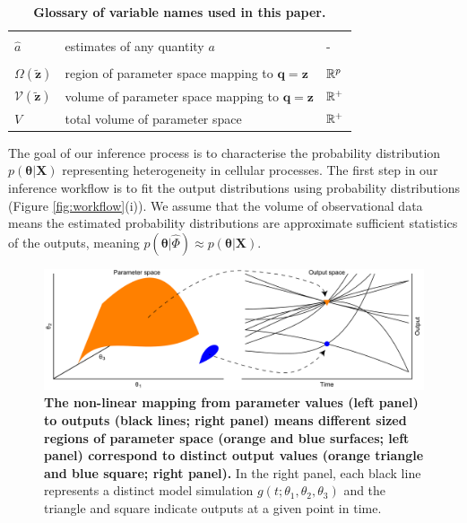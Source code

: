 \begin{table}[htbp]
\begin{adjustwidth}{-0.5in}{-0.5in}
\begin{tabularx}{1.1\textwidth}{lll}
&&\\
$\hat{a}$ & estimates of any quantity $a$                                                                             & - \\
&&\\
$\Omega(\tilde{\boldsymbol{z}})$      & region of parameter space mapping to $\boldsymbol{q}=\boldsymbol{z}$          & $\mathbb{R}^p$ \\
$\mathcal{V}(\tilde{\boldsymbol{z}})$ & volume of parameter space mapping to $\boldsymbol{q}=\boldsymbol{z}$          & $\mathbb{R}^+$ \\
$V$                                   & total volume of parameter space                                               & $\mathbb{R}^+$ \\
\end{tabularx}
\caption{\textbf{Glossary of variable names used in this paper.}} %
\label{tab:variable_glossary}
\end{adjustwidth}
\end{table}


The goal of our inference process is to  characterise the probability distribution $p(\boldsymbol{\theta}|\boldsymbol{X})$ representing heterogeneity in cellular processes. The first step in our inference workflow is to fit the output distributions using probability distributions (Figure \ref{fig:workflow}(i)). We assume that the volume of observational data means the estimated probability distributions are approximate sufficient statistics of the outputs, meaning $p(\boldsymbol{\theta}|\hat{\Phi}) \approx p(\boldsymbol{\theta}|\boldsymbol{X})$.

\begin{figure}[H]
	\centerline{\includegraphics[width=\textwidth]{../figures/contour_volumes.pdf}}
	\caption{\textbf{The non-linear mapping from parameter values (left panel) to outputs (black lines; right panel) means different sized regions of parameter space (orange and blue surfaces; left panel) correspond to distinct output values (orange triangle and blue square; right panel).} In the right panel, each black line represents a distinct model simulation $g(t; \theta_1, \theta_2, \theta_3)$ and the triangle and square indicate outputs at a given point in time.}
	\label{fig:contour_volumes}
\end{figure}

